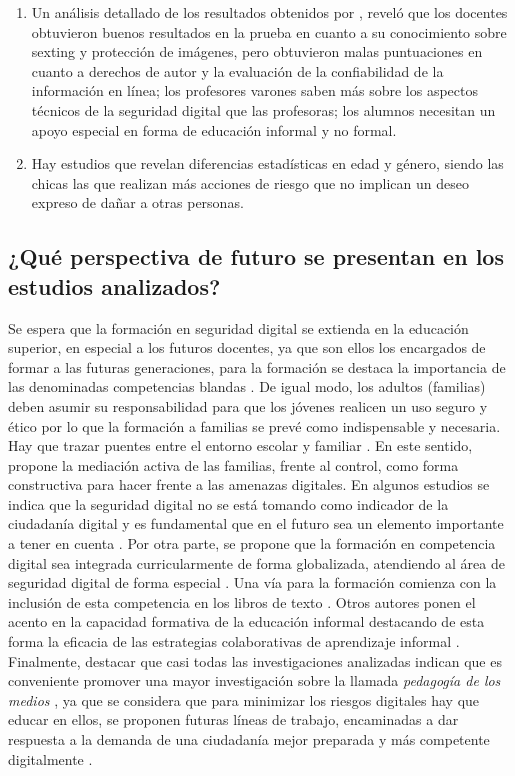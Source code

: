\documentclass[spanish]{textolivre}
\begin{document}
\begin{enumerate}
    \item Un análisis detallado de los resultados obtenidos por \textcite{potyrała2021teachers},  reveló que los docentes obtuvieron buenos resultados en la prueba en cuanto a su conocimiento sobre sexting y protección de imágenes, pero obtuvieron malas puntuaciones en cuanto a derechos de autor y la evaluación de la confiabilidad de la información en línea; los profesores varones saben más sobre los aspectos técnicos de la seguridad digital que las profesoras; los alumnos necesitan un apoyo especial en forma de educación informal y no formal.
    \item Hay estudios que revelan diferencias estadísticas en edad y género, siendo las chicas las que realizan más acciones de riesgo que no implican un deseo expreso de dañar a otras personas.
\end{enumerate}

\subsection{¿Qué perspectiva de futuro se presentan en los estudios analizados?}\label{sec-autores}
Se espera que la formación en seguridad digital se extienda en la educación superior, en especial a los futuros docentes, ya que son ellos los encargados de formar a las futuras generaciones, para la formación se destaca la importancia de las denominadas competencias blandas \cite{isrokatun2022digital,ogegbo2021assessment,takavarasha2018navigating}. De igual modo, los adultos (familias) deben asumir su responsabilidad para que los jóvenes realicen un uso seguro y ético por lo que la formación a familias se prevé como indispensable y necesaria. Hay que trazar puentes entre el entorno escolar y familiar \cite{mahadir_digital_2021}. En este sentido, \textcite{soldatova2020digital} propone la mediación activa de las familias, frente al control, como forma constructiva para hacer frente a las amenazas digitales. En algunos estudios se indica que la seguridad digital no se está tomando como indicador de la ciudadanía digital y es fundamental que en el futuro sea un elemento importante a tener en cuenta \cite{jwaifell2018proper}. Por otra parte, se propone que la formación en competencia digital sea integrada curricularmente de forma globalizada, atendiendo al área de seguridad digital de forma especial \cite{hazar2018digital}. Una vía para la formación comienza con la inclusión de esta competencia en los libros de texto \cite{kaban2020secure}. Otros autores ponen el acento en la capacidad formativa de la educación informal destacando de esta forma la eficacia de las estrategias colaborativas de aprendizaje informal \cite{quintana2020transmedia}. Finalmente, destacar que casi todas las investigaciones analizadas indican que es conveniente promover una mayor investigación sobre la llamada \textit{pedagogía de los medios} \cite{chelysheva2017basic}, ya que se considera que para minimizar los riesgos digitales hay que educar en ellos, se proponen futuras líneas de trabajo, encaminadas a dar respuesta a la demanda de una ciudadanía mejor preparada y más competente digitalmente \cite{arrufat2019competence,torres2019intervencion}.
\end{document}
